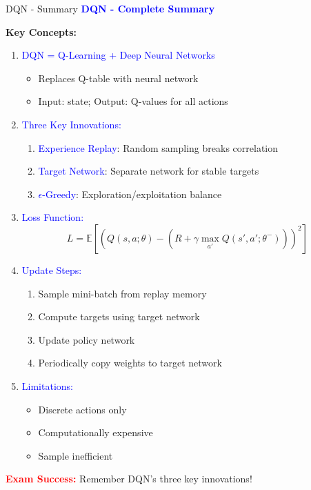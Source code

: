 \documentclass[8pt]{beamer}
\begin{document}
\begin{frame}{DQN - Summary}
\fontsize{6.5}{7.5}\selectfont
\textcolor{blue}{\textbf{DQN - Complete Summary}}

\textbf{Key Concepts:}
\begin{enumerate}
\item \textcolor{blue}{DQN = Q-Learning + Deep Neural Networks}
\begin{itemize}
\item Replaces Q-table with neural network
\item Input: state; Output: Q-values for all actions
\end{itemize}

\item \textcolor{blue}{Three Key Innovations:}
\begin{enumerate}
\item \textcolor{blue}{Experience Replay}: Random sampling breaks correlation
\item \textcolor{blue}{Target Network}: Separate network for stable targets
\item \textcolor{blue}{$\epsilon$-Greedy}: Exploration/exploitation balance
\end{enumerate}

\item \textcolor{blue}{Loss Function:}
\[
L = \mathbb{E}[(Q(s,a;\theta) - (R + \gamma \max_{a'} Q(s',a';\theta^-)))^2]
\]

\item \textcolor{blue}{Update Steps:}
\begin{enumerate}
\item Sample mini-batch from replay memory
\item Compute targets using target network
\item Update policy network
\item Periodically copy weights to target network
\end{enumerate}

\item \textcolor{blue}{Limitations:}
\begin{itemize}
\item Discrete actions only
\item Computationally expensive
\item Sample inefficient
\end{itemize}
\end{enumerate}

\textcolor{red}{\textbf{Exam Success:}} Remember DQN's three key innovations!
\end{frame}
\end{document}
